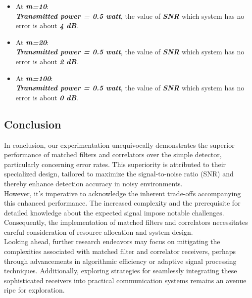 \documentclass[a4paper, 12pt, english]{article}
\begin{document}
\begin{itemize}
    \item At \textit{\textbf{m=10}}: \\
    \textit{\textbf{Transmitted power = 0.5 watt}}, the value of \textit{\textbf{SNR}} which system has no error is about \textit{\textbf{4 dB}}.
    \item At \textit{\textbf{m=20}}: \\
    \textit{\textbf{Transmitted power = 0.5 watt}}, the value of \textit{\textbf{SNR}} which system has no error is about \textit{\textbf{2 dB}}.
    \item At \textit{\textbf{m=100}}: \\
    \textit{\textbf{Transmitted power = 0.5 watt}}, the value of \textit{\textbf{SNR}} which system has no error is about \textit{\textbf{0 dB}}.
\end{itemize}
\null\newpage
\subsection{Conclusion}

In conclusion, our experimentation unequivocally demonstrates the superior performance of matched filters and correlators over the simple detector, particularly concerning error rates. This superiority is attributed to their specialized design, tailored to maximize the signal-to-noise ratio (SNR) and thereby enhance detection accuracy in noisy environments. \\

However, it's imperative to acknowledge the inherent trade-offs accompanying this enhanced performance. The increased complexity and the prerequisite for detailed knowledge about the expected signal impose notable challenges. Consequently, the implementation of matched filters and correlators necessitates careful consideration of resource allocation and system design. \\

Looking ahead, further research endeavors may focus on mitigating the complexities associated with matched filter and correlator receivers, perhaps through advancements in algorithmic efficiency or adaptive signal processing techniques. Additionally, exploring strategies for seamlessly integrating these sophisticated receivers into practical communication systems remains an avenue ripe for exploration. \\
\end{document}

